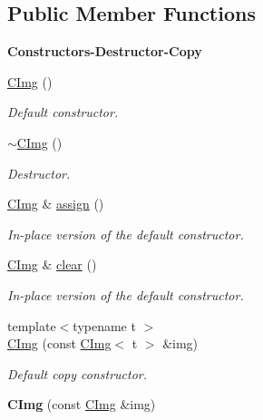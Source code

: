 \subsection*{Public Member Functions}
\begin{Indent}{\bf Constructors-\/Destructor-\/Copy}\par
{\em \label{_amgrp8b3b721d42d055cd3d667e8986043f18}
 }\begin{DoxyCompactItemize}
\item 
\hyperlink{structcimg__library_1_1_c_img_a76918ef9658da71040f29084bfe45de7}{CImg} ()
\begin{DoxyCompactList}\small\item\em Default constructor. \item\end{DoxyCompactList}\item 
\hyperlink{structcimg__library_1_1_c_img_a563f74a7b1f7f5313d1f1b86bfb23efd}{$\sim$CImg} ()
\begin{DoxyCompactList}\small\item\em Destructor. \item\end{DoxyCompactList}\item 
\hyperlink{structcimg__library_1_1_c_img}{CImg} \& \hyperlink{structcimg__library_1_1_c_img_a34e498eaf7ce5d83df329953e54f4292}{assign} ()
\begin{DoxyCompactList}\small\item\em In-\/place version of the default constructor. \item\end{DoxyCompactList}\item 
\hyperlink{structcimg__library_1_1_c_img}{CImg} \& \hyperlink{structcimg__library_1_1_c_img_a03f62716b3aeefb924ec762fbac6d959}{clear} ()
\begin{DoxyCompactList}\small\item\em In-\/place version of the default constructor. \item\end{DoxyCompactList}\item 
{\footnotesize template$<$typename t $>$ }\\\hyperlink{structcimg__library_1_1_c_img_a66c7fa3d12a095a5c5ade44f8c7f525a}{CImg} (const \hyperlink{structcimg__library_1_1_c_img}{CImg}$<$ t $>$ \&img)
\begin{DoxyCompactList}\small\item\em Default copy constructor. \item\end{DoxyCompactList}\item 
\hypertarget{structcimg__library_1_1_c_img_aacebe08bfd98028adc04ce1a997177f5}{
{\bfseries CImg} (const \hyperlink{structcimg__library_1_1_c_img}{CImg} \&img)}
\label{structcimg__library_1_1_c_img_aacebe08bfd98028adc04ce1a997177f5}


\end{DoxyCompactItemize}
\end{Indent}
